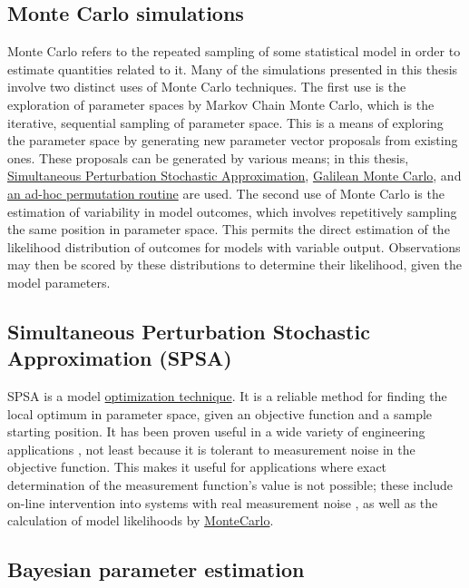 \subsection{Monte Carlo simulations}
\label{ssec:MonteCarlo}
Monte Carlo refers to the repeated sampling of some statistical model in order to estimate quantities related to it. Many of the simulations presented in this thesis involve two distinct uses of Monte Carlo techniques. The first use is the exploration of parameter spaces by Markov Chain Monte Carlo, which is the iterative, sequential sampling of parameter space. This is a means of exploring the parameter space by generating new parameter vector proposals from existing ones. These proposals can be generated by various means; in this thesis, \hyperref[ssec:SPSA]{Simultaneous Perturbation Stochastic Approximation}, \hyperref[ssec:GMC]{Galilean Monte Carlo}, and \hyperref[ssec:adhoc]{an ad-hoc permutation routine} are used. The second use of Monte Carlo is the estimation of variability in model outcomes, which involves repetitively sampling the same position in parameter space. This permits the direct estimation of the likelihood distribution of outcomes for models with variable output. Observations may then be scored by these distributions to determine their likelihood, given the model parameters.

\subsection{Simultaneous Perturbation Stochastic Approximation (SPSA)}
\label{ssec:SPSA}
SPSA is a model \hyperref[sampleoptim]{optimization technique}. It is a reliable method for finding the local optimum in parameter space, given an objective function and a sample starting position. It has been proven useful in a wide variety of engineering applications \cite{Kleinman1997,Zhou2008}, not least because it is tolerant to measurement noise in the objective function. This makes it useful for applications where exact determination of the measurement function's value is not possible; these include on-line intervention into systems with real measurement noise \cite{Zhou2008}, as well as the calculation of model likelihoods by \hyperref[ssec:MonteCarlo]{MonteCarlo}.

\subsection{Bayesian parameter estimation}
\label{ssec:Bayes}
